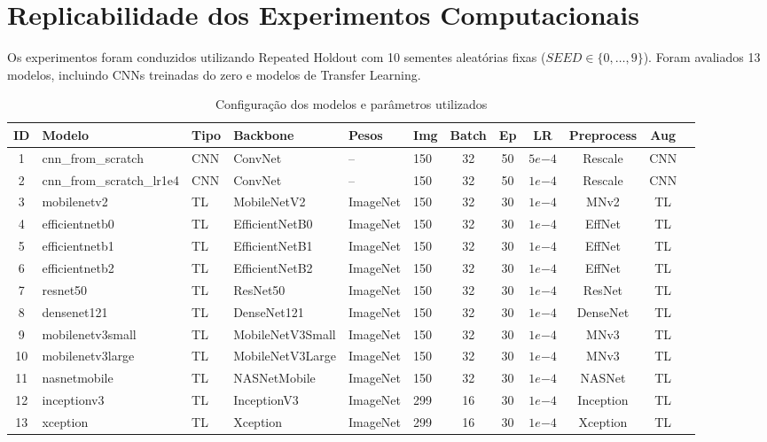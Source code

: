 
\section{Replicabilidade dos Experimentos Computacionais}

Os experimentos foram conduzidos utilizando Repeated Holdout com 10 sementes aleatórias fixas
($SEED \in \{0,\ldots,9\}$). Foram avaliados 13 modelos, incluindo CNNs treinadas do zero e modelos
de Transfer Learning.

\begin{longtable}{clllllcccccc}
\caption{Configuração dos modelos e parâmetros utilizados}\\
\hline
ID & Modelo & Tipo & Backbone & Pesos & Img & Batch & Ep & LR & Preprocess & Aug \\
\hline
1 & cnn\_from\_scratch & CNN & ConvNet & -- & 150 & 32 & 50 & $5e{-4}$ & Rescale & CNN \\
2 & cnn\_from\_scratch\_lr1e4 & CNN & ConvNet & -- & 150 & 32 & 50 & $1e{-4}$ & Rescale & CNN \\
3 & mobilenetv2 & TL & MobileNetV2 & ImageNet & 150 & 32 & 30 & $1e{-4}$ & MNv2 & TL \\
4 & efficientnetb0 & TL & EfficientNetB0 & ImageNet & 150 & 32 & 30 & $1e{-4}$ & EffNet & TL \\
5 & efficientnetb1 & TL & EfficientNetB1 & ImageNet & 150 & 32 & 30 & $1e{-4}$ & EffNet & TL \\
6 & efficientnetb2 & TL & EfficientNetB2 & ImageNet & 150 & 32 & 30 & $1e{-4}$ & EffNet & TL \\
7 & resnet50 & TL & ResNet50 & ImageNet & 150 & 32 & 30 & $1e{-4}$ & ResNet & TL \\
8 & densenet121 & TL & DenseNet121 & ImageNet & 150 & 32 & 30 & $1e{-4}$ & DenseNet & TL \\
9 & mobilenetv3small & TL & MobileNetV3Small & ImageNet & 150 & 32 & 30 & $1e{-4}$ & MNv3 & TL \\
10 & mobilenetv3large & TL & MobileNetV3Large & ImageNet & 150 & 32 & 30 & $1e{-4}$ & MNv3 & TL \\
11 & nasnetmobile & TL & NASNetMobile & ImageNet & 150 & 32 & 30 & $1e{-4}$ & NASNet & TL \\
12 & inceptionv3 & TL & InceptionV3 & ImageNet & 299 & 16 & 30 & $1e{-4}$ & Inception & TL \\
13 & xception & TL & Xception & ImageNet & 299 & 16 & 30 & $1e{-4}$ & Xception & TL \\
\hline
\end{longtable}
